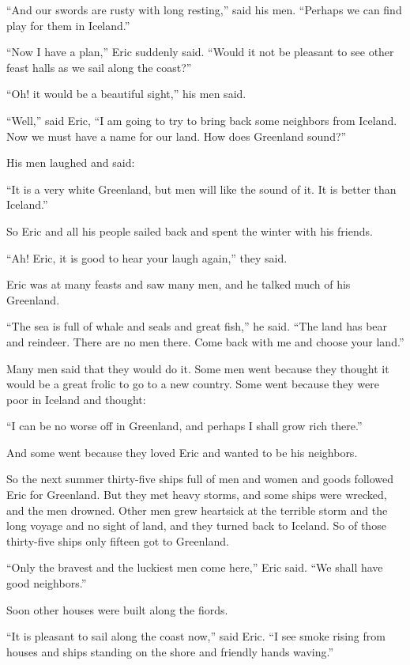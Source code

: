``And our swords are rusty with long resting,'' said his men. ``Perhaps
we can find play for them in Iceland.''

``Now I have a plan,'' Eric suddenly said. ``Would it not be pleasant to
see other feast halls as we sail along the coast?''

``Oh! it would be a beautiful sight,'' his men said.

``Well,'' said Eric, ``I am going to try to bring back some neighbors
from Iceland. Now we must have a name for our land. How does Greenland
sound?''

His men laughed and said:

``It is a very white Greenland, but men will like the sound of it. It is
better than Iceland.''

So Eric and all his people sailed back and spent the winter with his
friends.

``Ah! Eric, it is good to hear your laugh again,'' they said.

Eric was at many feasts and saw many men, and he talked much of his
Greenland.

``The sea is full of whale and seals and great fish,'' he said. ``The
land has bear and reindeer. There are no men there. Come back with me
and choose your land.''

Many men said that they would do it. Some men went because they thought
it would be a great frolic to go to a new country. Some went because
they were poor in Iceland and thought:

``I can be no worse off in Greenland, and perhaps I shall grow rich
there.''

And some went because they loved Eric and wanted to be his neighbors.

So the next summer thirty-five ships full of men and women and goods
followed Eric for Greenland. But they met heavy storms, and some ships
were wrecked, and the men drowned. Other men grew heartsick at the
terrible storm and the long voyage and no sight of land, and they turned
back to Iceland. So of those thirty-five ships only fifteen got to
Greenland.

``Only the bravest and the luckiest men come here,'' Eric said. ``We
shall have good neighbors.''

Soon other houses were built along the fiords.

``It is pleasant to sail along the coast now,'' said Eric. ``I see smoke
rising from houses and ships standing on the shore and friendly hands
waving.''
